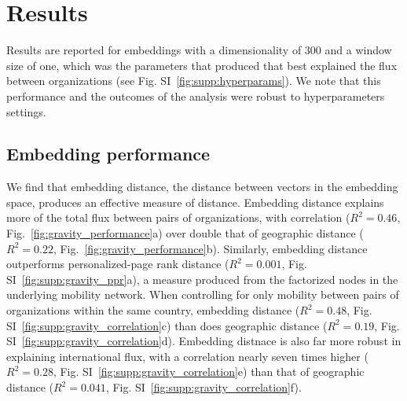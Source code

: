 \documentclass[12pt]{article} %
\begin{document}
\section{Results}\label{sec:results} %

Results are reported for embeddings with a dimensionality of 300 and a window size of one, which was the parameters that produced that best explained the flux between organizations (see Fig. SI~\ref{fig:supp:hyperparams}).
We note that this performance and the outcomes of the analysis were robust to hyperparameters settings.

%
%
\subsection*{Embedding performance}

We find that embedding distance, the distance between vectors in the embedding space, produces an effective measure of distance.
Embedding distance explains more of the total flux between pairs of organizations, with correlation ($R^{2} = 0.46$, Fig.~\ref{fig:gravity_performance}a) over double that of geographic distance ($R^{2} = 0.22$, Fig.~\ref{fig:gravity_performance}b).
Similarly, embedding distance outperforms personalized-page rank distance ($R^{2} = 0.001$, Fig. SI~\ref{fig:supp:gravity_ppr}a), a measure produced from the factorized nodes in the underlying mobility network.
When controlling for only mobility between pairs of organizations within the same country, embedding distance ($R^{2} = 0.48$, Fig. SI~\ref{fig:supp:gravity_correlation}c) than does geographic distance ($R^{2} = 0.19$, Fig. SI~\ref{fig:supp:gravity_correlation}d).
Embedding distnace is also far more robust in explaining international flux, with a correlation nearly seven times higher ($R^{2} = 0.28$, Fig. SI~\ref{fig:supp:gravity_correlation}e) than that of geographic distance ($R^{2} = 0.041$, Fig. SI~\ref{fig:supp:gravity_correlation}f).
\end{document}
